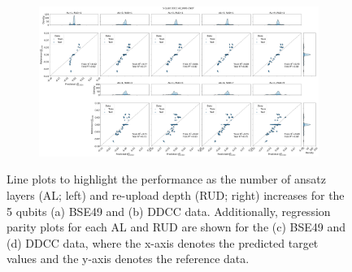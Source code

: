 \documentclass[journal=jacsat,manuscript=article]{achemso}
\begin{document}
\begin{figure}[H]
	\begin{subfigure}[b]{0.49\textwidth}
		\centering
		\includegraphics[width=\linewidth]{../images/DDCC/distribution_parity}
		\caption{}
		\label{fig:ddccdistribution_parity}
	\end{subfigure}	
	\caption{Line plots to highlight the performance as the number of ansatz layers (AL; left) and re-upload depth (RUD; right) increases for the 5 qubits (a) BSE49 and (b) DDCC data. Additionally, regression parity plots for each AL and RUD are shown for the (c) BSE49 and (d) DDCC data, where the x-axis denotes the predicted target values and the y-axis denotes the reference data.}
	\label{fig:BSE_distribution_parity}	
\end{figure}
\end{document}
